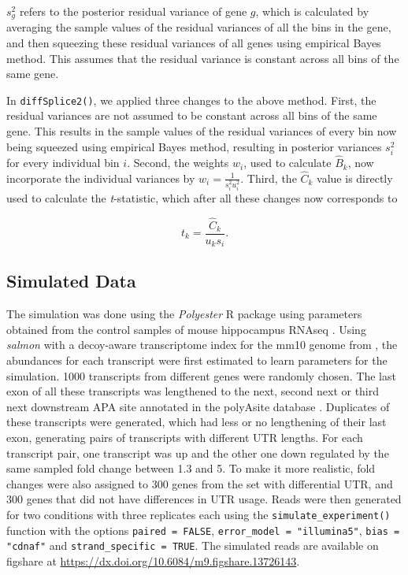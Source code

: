 \documentclass{bmcart}
\begin{document}
$s_{g}^2$ refers to the posterior residual variance of gene $g$, which is calculated by averaging the sample values of the residual variances of all the bins in the gene, and then squeezing these residual variances of all genes using empirical Bayes method. This assumes that the residual variance is constant across all bins of the same gene. 

In \texttt{diffSplice2()}, we applied three changes to the above method. First, the residual variances are not assumed to be constant across all bins of the same gene. This results in the sample values of the residual variances of every bin now being squeezed using empirical Bayes method, resulting in posterior variances $s_{i}^2$ for every individual bin $i$. Second, the weights $w_{i}$, used to calculate $\hat{B}_{k}$, now incorporate the individual variances by $w_{i}=\frac{1}{s_{i}^2u_{i}^2}$. Third, the $\hat{C}_{k}$ value is directly used to calculate the \textit{t}-statistic, which after all these changes now corresponds to

\begin{equation}
    t_{k} =\frac{\hat{C}_{k}}{u_{k}s_{i}}.
\end{equation}

\subsection{Simulated Data}
\label{sec:sim}
The simulation was done using the \textit{Polyester} R package  \cite{Frazee2015Polyester:Expression} using parameters obtained from the control samples of mouse hippocampus RNAseq \cite{Fontes2017Activity-DependentPotentiation}. Using \textit{salmon} \cite{PatroSalmon2017} with a decoy-aware transcriptome index for the mm10 genome from \cite{Stolarczyk2020Refgenie:Manager}, the abundances for each transcript were first estimated to learn parameters for the simulation. 1000 transcripts from different genes were randomly chosen. The last exon of all these transcripts was lengthened to the next, second next or third next downstream APA site annotated in the polyAsite database \cite{Herrmann2020PolyASiteSequencing}. Duplicates of these transcripts were generated, which had less or no lengthening of their last exon, generating pairs of transcripts with different UTR lengths. For each transcript pair, one transcript was up and the other one down regulated by the same sampled fold change between 1.3 and 5. To make it more realistic, fold changes were also assigned to 300 genes from the set with differential UTR, and 300 genes that did not have differences in UTR usage. Reads were then generated for two conditions with three replicates each using the \texttt{simulate\_experiment()} function with the options \texttt{paired = FALSE},  \texttt{error\_model = "illumina5"}, 
\texttt{bias = "cdnaf"} and \texttt{strand\_specific = TRUE}. The simulated reads are available on figshare at \url{https://dx.doi.org/10.6084/m9.figshare.13726143}.
\end{document}
